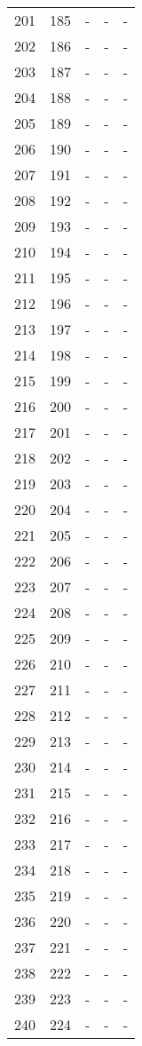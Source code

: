 \documentclass[10pt]{article}
\begin{document}
\begin {longtable}{l r r r r}
201 & 185 & - & - & - \\
202 & 186 & - & - & - \\
203 & 187 & - & - & - \\
204 & 188 & - & - & - \\
205 & 189 & - & - & - \\
206 & 190 & - & - & - \\
207 & 191 & - & - & - \\
208 & 192 & - & - & - \\
209 & 193 & - & - & - \\
210 & 194 & - & - & - \\
211 & 195 & - & - & - \\
212 & 196 & - & - & - \\
213 & 197 & - & - & - \\
214 & 198 & - & - & - \\
215 & 199 & - & - & - \\
216 & 200 & - & - & - \\
217 & 201 & - & - & - \\
218 & 202 & - & - & - \\
219 & 203 & - & - & - \\
220 & 204 & - & - & - \\
221 & 205 & - & - & - \\
222 & 206 & - & - & - \\
223 & 207 & - & - & - \\
224 & 208 & - & - & - \\
225 & 209 & - & - & - \\
226 & 210 & - & - & - \\
227 & 211 & - & - & - \\
228 & 212 & - & - & - \\
229 & 213 & - & - & - \\
230 & 214 & - & - & - \\
231 & 215 & - & - & - \\
232 & 216 & - & - & - \\
233 & 217 & - & - & - \\
234 & 218 & - & - & - \\
235 & 219 & - & - & - \\
236 & 220 & - & - & - \\
237 & 221 & - & - & - \\
238 & 222 & - & - & - \\
239 & 223 & - & - & - \\
240 & 224 & - & - & - \\

\end{longtable}
\end{document}
